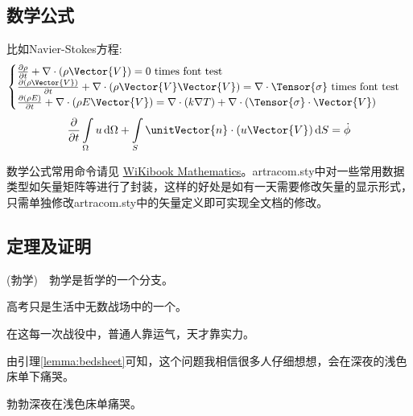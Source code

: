 \subsection{数学公式}

比如Navier-Stokes方程:
\begin{equation} \label{eq:ns}
    \begin{cases}
        \frac{\partial \rho}{\partial t} + \nabla\cdot(\rho\Vector{V}) = 0 \ \mathrm{times\ font\ test}\\
        \frac{\partial (\rho\Vector{V})}{\partial t} + \nabla\cdot(\rho\Vector{V}\Vector{V}) = \nabla\cdot\Tensor{\sigma} \ \text{times font test}\\
        \frac{\partial (\rho E)}{\partial t} + \nabla\cdot(\rho E\Vector{V}) = \nabla\cdot(k\nabla T) + \nabla\cdot(\Tensor{\sigma}\cdot\Vector{V})
    \end{cases}
\end{equation}
\begin{equation}
    \frac{\partial }{\partial t}\int\limits_{\Omega} u \, \mathrm{d}\Omega + \int\limits_{S} \unitVector{n}\cdot(u\Vector{V}) \, \mathrm{d}S = \dot{\phi}
\end{equation}

数学公式常用命令请见 \href{https://en.wikibooks.org/wiki/LaTeX/Mathematics}{WiKibook Mathematics}。artracom.sty中对一些常用数据类型如矢量矩阵等进行了封装，这样的好处是如有一天需要修改矢量的显示形式，只需单独修改artracom.sty中的矢量定义即可实现全文档的修改。
\subsection{定理及证明}
\begin{defn}
	(勃学)　勃学是哲学的一个分支。
\end{defn}

\begin{prop}
	高考只是生活中无数战场中的一个。
\end{prop}

\begin{thm}
	在这每一次战役中，普通人靠运气，天才靠实力。
\end{thm}

\begin{pf}
	由引理\ref{lemma:bedsheet}可知，这个问题我相信很多人仔细想想，会在深夜的浅色床单下痛哭。
\end{pf}

\begin{cor}
	勃勃深夜在浅色床单痛哭。
\end{cor}

